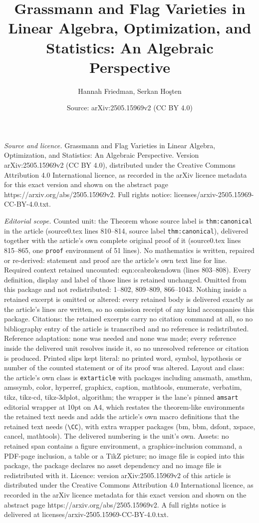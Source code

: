 \documentclass[10pt,a4paper]{amsart}
\title[Grassmann and Flag Varieties in Linear Algebra, Optimization]{Grassmann and Flag Varieties in Linear Algebra, Optimization, and Statistics: An Algebraic Perspective}
\author{Hannah Friedman, Serkan Ho\c{s}ten}
\date{Source: arXiv:2505.15969v2 (CC BY 4.0)}
\begin{document}
\maketitle

\noindent\emph{Source and licence.} Grassmann and Flag Varieties in Linear Algebra, Optimization, and Statistics: An Algebraic Perspective. Version arXiv:2505.15969v2 (CC BY 4.0), distributed under the Creative Commons Attribution 4.0 International licence, as recorded in the arXiv licence metadata for this exact version and shown on the abstract page https://arxiv.org/abs/2505.15969v2. Full rights notice: licenses/arxiv-2505.15969-CC-BY-4.0.txt.\par\smallskip

\noindent\textit{Editorial scope.} Counted unit: the Theorem whose source label is \texttt{thm:canonical} in the article (source0.tex lines 810--814, source label \texttt{thm:canonical}), delivered together with the article's own complete original proof of it (source0.tex lines 815--865, one \texttt{proof} environment of 51 lines). No mathematics is written, repaired or re-derived: statement and proof are the article's own text line for line. Required context retained uncounted: eqn:ccabrokendown (lines 803--808). Every definition, display and label of those lines is retained unchanged. Omitted from this package and not redistributed: 1--802, 809--809, 866--1043. Nothing inside a retained excerpt is omitted or altered: every retained body is delivered exactly as the article's lines are written, so no omission receipt of any kind accompanies this package. Citations: the retained excerpts carry no citation command at all, so no bibliography entry of the article is transcribed and no reference is redistributed. Reference adaptation: none was needed and none was made; every reference inside the delivered unit resolves inside it, so no unresolved reference or citation is produced. Printed slips kept literal: no printed word, symbol, hypothesis or number of the counted statement or of its proof was altered. Layout and class: the article's own class is \texttt{extarticle} with packages including amsmath, amsthm, amssymb, color, hyperref, graphicx, caption, mathtools, enumerate, verbatim, tikz, tikz-cd, tikz-3dplot, algorithm; the wrapper is the lane's pinned \texttt{amsart} editorial wrapper at 10pt on A4, which restates the theorem-like environments the retained text needs and adds the article's own macro definitions that the retained text needs (\texttt{\textbackslash CC}), with extra wrapper packages (bm, bbm, dsfont, xspace, cancel, mathtools). The delivered numbering is the unit's own. Assets: no retained span contains a figure environment, a graphics-inclusion command, a PDF-page inclusion, a table or a TikZ picture; no image file is copied into this package, the package declares no asset dependency and no image file is redistributed with it. Licence: version arXiv:2505.15969v2 of this article is distributed under the Creative Commons Attribution 4.0 International licence, as recorded in the arXiv licence metadata for this exact version and shown on the abstract page https://arxiv.org/abs/2505.15969v2. A full rights notice is delivered at licenses/arxiv-2505.15969-CC-BY-4.0.txt. 
\end{document}
